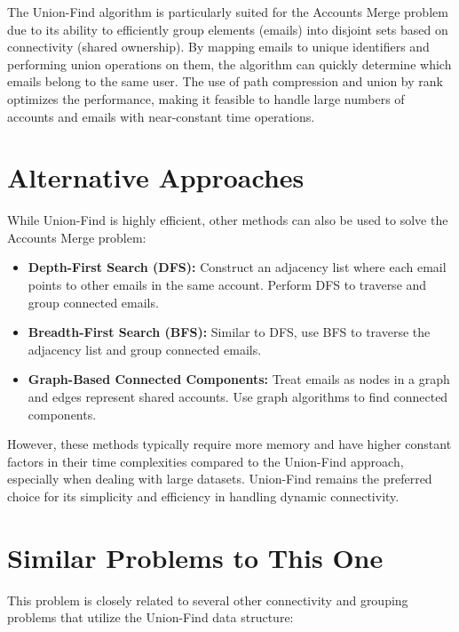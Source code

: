 The Union-Find algorithm is particularly suited for the Accounts Merge problem due to its ability to efficiently group elements (emails) into disjoint sets based on connectivity (shared ownership). By mapping emails to unique identifiers and performing union operations on them, the algorithm can quickly determine which emails belong to the same user. The use of path compression and union by rank optimizes the performance, making it feasible to handle large numbers of accounts and emails with near-constant time operations.

\section*{Alternative Approaches}

While Union-Find is highly efficient, other methods can also be used to solve the Accounts Merge problem:

\begin{itemize}
    \item \textbf{Depth-First Search (DFS):}  
    Construct an adjacency list where each email points to other emails in the same account. Perform DFS to traverse and group connected emails.

    \item \textbf{Breadth-First Search (BFS):}  
    Similar to DFS, use BFS to traverse the adjacency list and group connected emails.

    \item \textbf{Graph-Based Connected Components:} 
    Treat emails as nodes in a graph and edges represent shared accounts. Use graph algorithms to find connected components.
\end{itemize}

However, these methods typically require more memory and have higher constant factors in their time complexities compared to the Union-Find approach, especially when dealing with large datasets. Union-Find remains the preferred choice for its simplicity and efficiency in handling dynamic connectivity.

\section*{Similar Problems to This One}

This problem is closely related to several other connectivity and grouping problems that utilize the Union-Find data structure:

